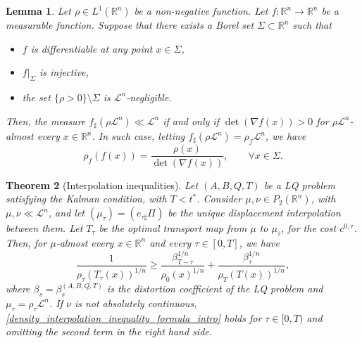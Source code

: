 \documentclass[reqno]{amsart}
\theoremstyle{plain}
\newtheorem{thm}{Theorem}[section]
\newtheorem{lem}[thm]{Lemma}
\theoremstyle{definition}
\theoremstyle{remark}
\begin{document}
		\begin{lem}\label{Jacobian_and_densities}
			Let $\rho\in L^1(\mathbb{R}^n)$ be a non-negative function. Let $f:\mathbb{R}^n\to\mathbb{R}^n$ be a measurable function. Suppose that there exists a Borel set $\Sigma\subset\mathbb{R}^n$ such that
			\begin{itemize}
				\item $f$ is differentiable at any point $x\in\Sigma$,
				\item $f|_{\Sigma}$ is injective,
				\item the set $\{\rho>0\}\setminus\Sigma$ is $\mathscr{L}^n$-negligible.
			\end{itemize}
			Then, the measure $f_{\sharp}(\rho\mathscr{L}^n) \ll \mathscr{L}^n$ if and only if $\det(\nabla f(x))>0$ for $\rho\mathscr{L}^n$-almost every $x\in\mathbb{R}^n$. In such case, letting $f_{\sharp}(\rho\mathscr{L}^n)=\rho_f\mathscr{L}^n$, we have
			\begin{equation}
				\rho_f(f(x))=\frac{\rho(x)}{\det(\nabla f(x))},\qquad\forall x\in\Sigma.
			\end{equation}
		\end{lem}
		\begin{thm}[Interpolation inequalities]\label{density_interpolation_inequality}
Let $(A,B,Q,T)$ be a LQ problem satisfying the Kalman condition, with $T<t^*$. Consider $\mu,\nu\in P_2(\mathbb{R}^n)$, with $\mu, \nu \ll\mathscr{L}^n$, and let $(\mu_\tau)=(e_{\tau\sharp}\Pi)$ be the unique displacement interpolation between them. Let $T_\tau$ be the optimal transport map from $\mu$ to $\mu_\tau$, for the cost $c^{0,\tau}$. Then, for $\mu$-almost every $x\in\mathbb{R}^n$ and every $\tau\in[0,T]$, we have
			\begin{equation}\label{density_interpolation_inequality_formula}
				\frac{1}{\rho_\tau(T_\tau(x))^{1/n}}\geq\frac{\beta_{T-\tau}^{1/n}}{\rho_0(x)^{1/n}} +\frac{\beta_{\tau}^{1/n}}{\rho_T(T(x))^{1/n}},
			\end{equation}
			where $\beta_s=\beta_s^{(A,B,Q,T)}$ is the distortion coefficient of the LQ problem and $\mu_\tau=\rho_\tau\mathscr{L}^n$. 
            If $\nu$ is not absolutely continuous, \eqref{density_interpolation_inequality_formula_intro} holds for $\tau\in[0,T)$ and omitting the second term in the right hand side.
            \end{thm}
\end{document}
